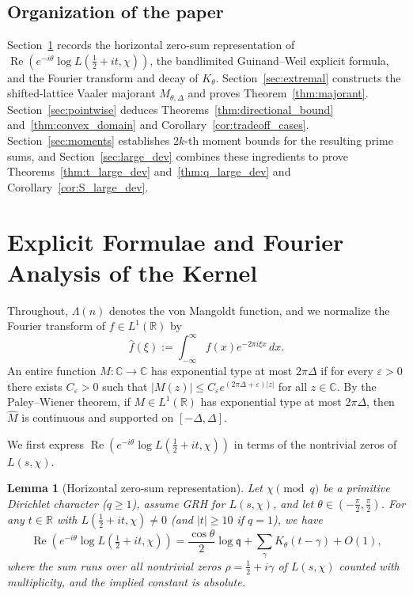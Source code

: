 \documentclass[11pt,a4paper]{amsart}
\newtheorem{lemma}[theorem]{Lemma}
\theoremstyle{remark}
\numberwithin{equation}{section}
\newcommand{\R}{\mathbb{R}}
\newcommand{\C}{\mathbb{C}}
\newcommand{\q}{\mathfrak{q}}
\begin{document}
\subsection*{Organization of the paper}
Section~\ref{sec:prelim} records the horizontal zero-sum representation of $\operatorname{Re}(e^{-i\theta}\log L(\frac{1}{2}+it,\chi))$, the bandlimited Guinand--Weil explicit formula, and the Fourier transform and decay of $K_\theta$. Section~\ref{sec:extremal} constructs the shifted-lattice Vaaler majorant $M_{\theta,\Delta}$ and proves Theorem~\ref{thm:majorant}. Section~\ref{sec:pointwise} deduces Theorems~\ref{thm:directional_bound} and~\ref{thm:convex_domain} and Corollary~\ref{cor:tradeoff_cases}. Section~\ref{sec:moments} establishes $2k$-th moment bounds for the resulting prime sums, and Section~\ref{sec:large_dev} combines these ingredients to prove Theorems~\ref{thm:t_large_dev} and~\ref{thm:q_large_dev} and Corollary~\ref{cor:S_large_dev}.

\section{Explicit Formulae and Fourier Analysis of the Kernel}\label{sec:prelim}

Throughout, $\Lambda(n)$ denotes the von Mangoldt function, and we normalize the Fourier transform of $f \in L^1(\R)$ by
\[
  \widehat{f}(\xi) := \int_{-\infty}^\infty f(x)e^{-2\pi i\xi x}\,dx.
\]
An entire function $M : \C \to \C$ has exponential type at most $2\pi\Delta$ if for every $\varepsilon > 0$ there exists $C_\varepsilon > 0$ such that $|M(z)| \le C_\varepsilon e^{(2\pi\Delta+\varepsilon)|z|}$ for all $z \in \C$. By the Paley--Wiener theorem, if $M \in L^1(\R)$ has exponential type at most $2\pi\Delta$, then $\widehat{M}$ is continuous and supported on $[-\Delta,\Delta]$.

We first express $\operatorname{Re}(e^{-i\theta}\log L(\frac{1}{2}+it,\chi))$ in terms of the nontrivial zeros of $L(s,\chi)$.

\begin{lemma}[Horizontal zero-sum representation]\label{lem:horizontal}
Let $\chi \pmod q$ be a primitive Dirichlet character ($q \ge 1$), assume GRH for $L(s,\chi)$, and let $\theta \in (-\frac{\pi}{2},\frac{\pi}{2})$. For any $t \in \R$ with $L(\frac{1}{2}+it,\chi) \neq 0$ (and $|t| \ge 10$ if $q = 1$), we have
\begin{equation}\label{eq:horizontal}
  \operatorname{Re}\!\left(e^{-i\theta}\log L(\tfrac{1}{2}+it,\chi)\right)
  = \frac{\cos\theta}{2}\log\q + \sum_\gamma K_\theta(t-\gamma) + O(1),
\end{equation}
where the sum runs over all nontrivial zeros $\rho = \frac{1}{2}+i\gamma$ of $L(s,\chi)$ counted with multiplicity, and the implied constant is absolute.
\end{lemma}
\end{document}
